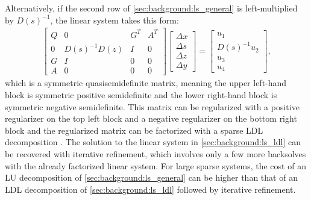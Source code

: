 Alternatively, if the second row of \eqref{sec:background:ls_general} is left-multiplied by $D(s)^{-1}$, the linear system takes this form:
%
\begin{align}
    \begin{bmatrix}
        Q & 0 & G^{T} & A^{T} \\
        0 & D(s)^{-1}D(z) & I & 0 \\
        G & I & 0 & 0 \\
        A & 0 & 0 & 0
    \end{bmatrix} 
    \begin{bmatrix}
        \Delta x \\
        \Delta s \\
        \Delta z \\
        \Delta y
    \end{bmatrix}
    = \begin{bmatrix}
        u_1 \\ D(s)^{-1} u_2 \\ u_3 \\ u_4
        \end{bmatrix} \label{sec:background:ls_ldl},
\end{align}
%
which is a symmetric quasisemidefinite matrix, meaning the upper left-hand block is symmetric positive semidefinite and the lower right-hand block is symmetric negative semidefinite. This matrix can be regularized with a positive regularizer on the top left block and a negative regularizer on the bottom right block and the regularized matrix can be factorized with a sparse LDL decomposition \cite{mattingley2012}. The solution to the linear system in \eqref{sec:background:ls_ldl} can be recovered with iterative refinement, which involves only a few more backsolves with the already factorized linear system. For large sparse systems, the cost of an LU decomposition of \eqref{sec:background:ls_general} can be higher than that of an LDL decomposition of \eqref{sec:background:ls_ldl} followed by iterative refinement. 
%
